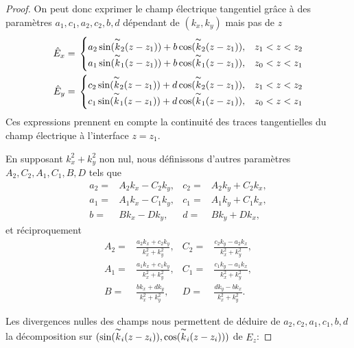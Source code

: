 \begin{proof}
    On peut donc exprimer le champ électrique tangentiel grâce à des paramètres \(a_1,c_1,a_2,c_2,b,d\) dépendant de \((k_x,k_y)\) mais pas de \(z\)
    \begin{align*}
    \hat{E}_x={}& 
    \begin{cases}
    a_2\sin(\overset{\thicksim}{k}_2(z-z_1))+b\cos(\overset{\thicksim}{k}_2(z-z_1)),&  z_1<z<z_2
    \\
    a_1\sin(\overset{\thicksim}{k}_1(z-z_1))+b\cos(\overset{\thicksim}{k}_1(z-z_1)),&  z_0<z<z_1
    \end{cases}
    \\
    \hat{E}_y={}&
    \begin{cases}
    c_2\sin(\overset{\thicksim}{k}_2(z-z_1))+d\cos(\overset{\thicksim}{k}_2(z-z_1)),&   z_1<z<z_2
    \\
    c_1\sin(\overset{\thicksim}{k}_1(z-z_1))+d\cos(\overset{\thicksim}{k}_1(z-z_1)),&   z_0<z<z_1
    \end{cases}
    \end{align*}
    Ces expressions prennent en compte la continuité des traces tangentielles du champ électrique à l'interface \(z=z_1\).

    En supposant \(k_x^2 + k_y^2\) non nul, nous définissons d'autres paramètres \(A_2,C_2, A_1, C_1, B, D\) tels que
    \begin{align*}
    a_2 ={}& A_2k_x - C_2k_y, & c_2 ={}& A_2k_y + C_2 k_x,
    \\
    a_1 ={}& A_1k_x - C_1k_y, & c_1 ={}& A_1k_y + C_1 k_x,
    \\
    b ={}& Bk_x - Dk_y, & d ={}& Bk_y + D k_x,
    \end{align*}
    et réciproquement
    \begin{align*}
    A_2 ={}& \frac{a_2 k_x + c_2 k_y}{k_x^2 + k_y^2}, & C_2 ={}& \frac{c_2 k_y - a_2 k_x}{k_x^2 + k_y^2},
    \\
    A_1 ={}& \frac{a_1 k_x + c_1 k_y}{k_x^2 + k_y^2}, & C_1 ={}& \frac{c_1 k_y - a_1 k_x}{k_x^2 + k_y^2},
    \\
    B ={}& \frac{b k_x + d k_y}{k_x^2 + k_y^2}, & D ={}& \frac{d k_y - b k_x}{k_x^2 + k_y^2}.
    \end{align*}

    Les divergences nulles des champs nous permettent de déduire de \(a_2,c_2,a_1,c_1,b,d\) la décomposition sur \((\sin(\overset{\thicksim}{k}_i(z-z_i)),\cos(\overset{\thicksim}{k}_i(z-z_i)))\) de \(E_z\):


\end{proof}
